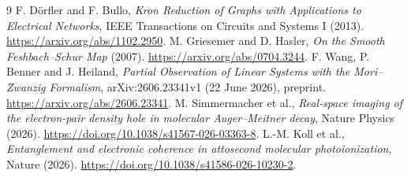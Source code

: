 \documentclass[11pt]{article}
\begin{document}
\begin{thebibliography}{9}
 F. D\"orfler and F. Bullo, \emph{Kron Reduction of Graphs with Applications to Electrical Networks}, IEEE Transactions on Circuits and Systems I (2013). \url{https://arxiv.org/abs/1102.2950}.
 M. Griesemer and D. Hasler, \emph{On the Smooth Feshbach--Schur Map} (2007). \url{https://arxiv.org/abs/0704.3244}.
 F. Wang, P. Benner and J. Heiland, \emph{Partial Observation of Linear Systems with the Mori--Zwanzig Formalism}, arXiv:2606.23341v1 (22 June 2026), preprint. \url{https://arxiv.org/abs/2606.23341}.
 M. Simmermacher et al., \emph{Real-space imaging of the electron-pair density hole in molecular Auger--Meitner decay}, Nature Physics (2026). \url{https://doi.org/10.1038/s41567-026-03363-8}.
 L.-M. Koll et al., \emph{Entanglement and electronic coherence in attosecond molecular photoionization}, Nature (2026). \url{https://doi.org/10.1038/s41586-026-10230-2}.
\end{thebibliography}
\end{document}
